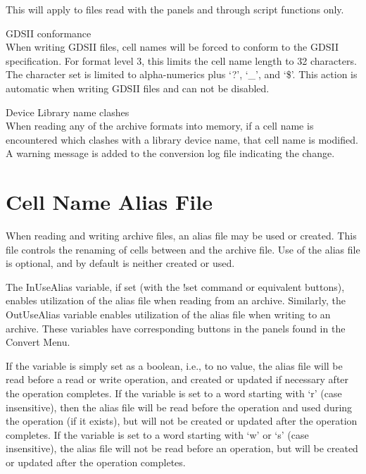 \begin{description}
This will apply to files read with the panels and through
script functions only.

\item{GDSII conformance}\\
When writing GDSII files, cell names will be forced to conform to the
GDSII specification.  For format level 3, this limits the cell name
length to 32 characters.  The character set is limited to
alpha-numerics plus `{\vt ?}', `{\vt \_}', and `{\vt \$}'.  This
action is automatic when writing GDSII files and can not be disabled.

\item{Device Library name clashes}\\
When reading any of the archive formats into memory, if a cell name is
encountered which clashes with a library device name, that cell name
is modified.  A warning message is added to the conversion log file
indicating the change.
\end{description}


\section{Cell Name Alias File}
\label{aliasfile}
When reading and writing archive files, an alias file may be used or
created.  This file controls the renaming of cells between {\Xic} and
the archive file.  Use of the alias file is optional, and by default
is neither created or used.

The {\et InUseAlias} variable, if set (with the {\cb !set} command or
equivalent buttons), enables utilization of the alias file when
reading from an archive.  Similarly, the {\et OutUseAlias} variable
enables utilization of the alias file when writing to an archive. 
These variables have corresponding buttons in the panels found in the
{\cb Convert Menu}.

If the variable is simply set as a boolean, i.e., to no value, the
alias file will be read before a read or write operation, and created
or updated if necessary after the operation completes.  If the
variable is set to a word starting with `{\vt r}' (case insensitive),
then the alias file will be read before the operation and used during
the operation (if it exists), but will not be created or updated after
the operation completes.  If the variable is set to a word starting
with `{\vt w}' or `{\vt s}' (case insensitive), the alias file will
not be read before an operation, but will be created or updated after
the operation completes.

